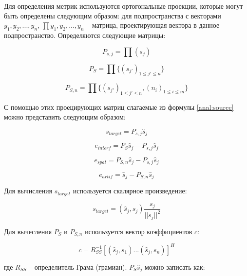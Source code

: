 Для определения метрик используются ортогональные проекции, которые могут быть определены следующим образом: для подпространства с векторами $y_1, y_2, ... , y_n$, $\prod{y_1, y_2, ... , y_n}$ -- матрица, проектирующая вектора в данное подпространство. Определяются следующие матрицы:

\begin{equation}
P_{s,j} = \prod(s_j)
\end{equation}

\begin{equation}
P_{S} = \prod\{(s_{j'})_{1\le j' \le n}\}
\end{equation}

\begin{equation}
P_{S, n} = \prod\{(s_{j'})_{1\le j' \le n}, (n_i)_{1 \le i \le m} \}
\end{equation}

С помощью этих проецирующих матриц слагаемые из формулы \ref{anal:source} можно представить следующим образом:

\begin{equation}
	s_{target} = P_{s,j} \hat{s}_j
\end{equation}

\begin{equation}
e_{interf} = P_{S} \hat{s}_j - P_{s,j} \hat{s}_j
\end{equation}

\begin{equation}
e_{spat} = P_{S, n} \hat{s}_j - P_{s,j} \hat{s}_j
\end{equation}

\begin{equation}
e_{artif} = \hat{s}_j - P_{S, n} \hat{s}_j
\end{equation}

Для вычисления $s_{target}$ используется скалярное произведение:

\begin{equation}
s_{target} = (\hat{s}_j, s_j) \frac{s_j}{|| s_j ||^2}
\end{equation}

Для вычесления $P_S$ и $P_{S,n}$ используется вектор коэффициентов $c$:

\begin{equation}
c = R_{SS}^{-1}[ (\hat{s}_j, s_1) ... (\hat{s}_j, s_n) ]^H
\end{equation}

где $R_{SS}$ -- определитель Грама (грамиан). $P_S \hat{s}_j$ можно записать как:

